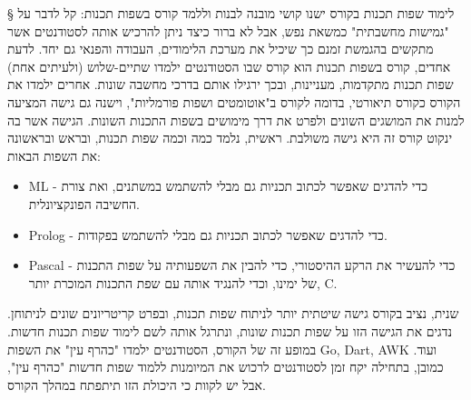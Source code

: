 § לימוד שפות תכנות בקורס
ישנו קושי מובנה לבנות וללמד קורס בשפות תכנות: קל לדבר על "גמישות מחשבתית" כמשאת
נפש, אבל לא ברור כיצד ניתן להרכיש אותה לסטודנטים אשר מתקשים בהגמשת זמנם כך
שיכיל את מערכת הלימודים, העבודה והפנאי גם יחד.  לדעת אחדים, קורס בשפות תכנות
הוא קורס שבו הסטודנטים ילמדו שתיים-שלוש (ולעיתים אחת) שפות תכנות מתקדמות,
מעניינות, ובכך ירגילו אותם בדרכי מחשבה שונות.  אחרים ילמדו את הקורס כקורס
תיאורטי, בדומה לקורס ב"אוטומטים ושפות פורמליות", וישנה גם גישה המציעה למנות את
המושגים השונים ולפרט את דרך מימושים בשפות התכנות השונות.
הגישה אשר בה ינקוט קורס זה היא גישה משולבת. ראשית, נלמד כמה וכמה שפות תכנות,
ובראש ובראשונה את השפות הבאות: 
  \begin{itemize}
         \item ML - כדי להדגים שאפשר לכתוב תכניות גם מבלי להשתמש במשתנים, ואת צורת החשיבה הפונקציונלית.
         \item Prolog - כדי להדגים שאפשר לכתוב תכניות גם מבלי להשתמש בפקודות.
         \item Pascal - כדי להעשיר את הרקע ההיסטורי, כדי להבין את השפעותיה על שפות התכנות של ימינו, וכדי להנגיד אותה עם שפת התכנות המוכרת יותר, C.
\end{itemize}
שנית, נציב בקורס גישה שיטתית יותר לניתוח שפות תכנות, ובפרט קריטריונים שונים
לניתוחן. נדגים את הגישה הזו על שפות תכנות שונות, ונתרגל אותה לשם לימוד שפות
תכנות חדשות. במופע זה של הקורס, הסטודנטים ילמדו "כהרף עין" את השפות Go, Dart,
AWK ועוד. כמובן, בתחילה יקח זמן לסטודנטים לרכוש את המיומנות ללמוד שפות חדשות
"כהרף עין", אבל יש לקוות כי היכולת הזו תיתפתח במהלך הקורס. 
